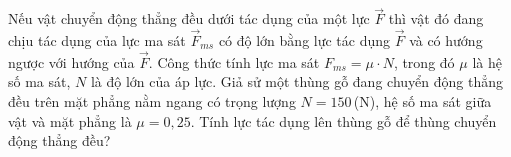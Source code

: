 \begin{ex}%
Nếu vật chuyển động thẳng đều dưới tác dụng của một lực $\overrightarrow{F}$ thì vật đó đang chịu tác dụng của lực ma sát $\overrightarrow{F}_{ms}$ có độ lớn bằng lực tác dụng $\overrightarrow{F}$ và có hướng ngược với hướng của $\overrightarrow{F}$. Công thức tính lực ma sát $F_{ms}=\mu\cdot N$, trong đó $\mu$ là hệ số ma sát, $N$ là độ lớn của áp lực. Giả sử một thùng gỗ đang chuyển động thẳng đều trên mặt phẳng nằm ngang có trọng lượng $N=150$\,(N), hệ số ma sát giữa vật và mặt phẳng là $\mu=0{,}25$. Tính lực tác dụng lên thùng gỗ để thùng chuyển động thẳng đều?
\end{ex}

